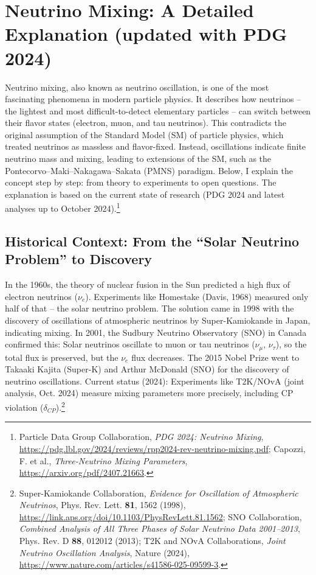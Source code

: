 	\section{Neutrino Mixing: A Detailed Explanation (updated with PDG 2024)}
	\label{app:neutrino}
	
	Neutrino mixing, also known as neutrino oscillation, is one of the most fascinating phenomena in modern particle physics. It describes how neutrinos -- the lightest and most difficult-to-detect elementary particles -- can switch between their flavor states (electron, muon, and tau neutrinos). This contradicts the original assumption of the Standard Model (SM) of particle physics, which treated neutrinos as massless and flavor-fixed. Instead, oscillations indicate finite neutrino mass and mixing, leading to extensions of the SM, such as the Pontecorvo--Maki--Nakagawa--Sakata (PMNS) paradigm. Below, I explain the concept step by step: from theory to experiments to open questions. The explanation is based on the current state of research (PDG 2024 and latest analyses up to October 2024).\footnote{Particle Data Group Collaboration, \emph{PDG 2024: Neutrino Mixing}, \url{https://pdg.lbl.gov/2024/reviews/rpp2024-rev-neutrino-mixing.pdf}; Capozzi, F. et al., \emph{Three-Neutrino Mixing Parameters}, \url{https://arxiv.org/pdf/2407.21663}.}
	
	\subsection{Historical Context: From the ``Solar Neutrino Problem'' to Discovery}
	
	In the 1960s, the theory of nuclear fusion in the Sun predicted a high flux of electron neutrinos ($\nu_e$). Experiments like Homestake (Davis, 1968) measured only half of that -- the solar neutrino problem. The solution came in 1998 with the discovery of oscillations of atmospheric neutrinos by Super-Kamiokande in Japan, indicating mixing. In 2001, the Sudbury Neutrino Observatory (SNO) in Canada confirmed this: Solar neutrinos oscillate to muon or tau neutrinos ($\nu_\mu$, $\nu_\tau$), so the total flux is preserved, but the $\nu_e$ flux decreases. The 2015 Nobel Prize went to Takaaki Kajita (Super-K) and Arthur McDonald (SNO) for the discovery of neutrino oscillations. Current status (2024): Experiments like T2K/NOvA (joint analysis, Oct. 2024) measure mixing parameters more precisely, including CP violation ($\delta_{CP}$).\footnote{Super-Kamiokande Collaboration, \emph{Evidence for Oscillation of Atmospheric Neutrinos}, Phys. Rev. Lett. \textbf{81}, 1562 (1998), \url{https://link.aps.org/doi/10.1103/PhysRevLett.81.1562}; SNO Collaboration, \emph{Combined Analysis of All Three Phases of Solar Neutrino Data 2001--2013}, Phys. Rev. D \textbf{88}, 012012 (2013); T2K and NOvA Collaborations, \emph{Joint Neutrino Oscillation Analysis}, Nature (2024), \url{https://www.nature.com/articles/s41586-025-09599-3}.}
	

